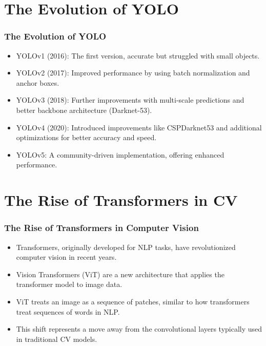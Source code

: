 \documentclass{beamer}
\begin{document}

\section{The Evolution of YOLO}
\begin{frame}
\frametitle{\textbf{The Evolution of YOLO}}
\begin{itemize}
    \item YOLOv1 (2016): The first version, accurate but struggled with small objects.
    \item YOLOv2 (2017): Improved performance by using batch normalization and anchor boxes.
    \item YOLOv3 (2018): Further improvements with multi-scale predictions and better backbone architecture (Darknet-53).
    \item YOLOv4 (2020): Introduced improvements like CSPDarknet53 and additional optimizations for better accuracy and speed.
    \item YOLOv5: A community-driven implementation, offering enhanced performance.
\end{itemize}
\end{frame}


\section{The Rise of Transformers in CV}
\begin{frame}
\frametitle{The Rise of Transformers in Computer Vision}
\begin{itemize}
    \item Transformers, originally developed for NLP tasks, have revolutionized computer vision in recent years.
    \item Vision Transformers (ViT) are a new architecture that applies the transformer model to image data.
    \item ViT treats an image as a sequence of patches, similar to how transformers treat sequences of words in NLP.
    \item This shift represents a move away from the convolutional layers typically used in traditional CV models.
\end{itemize}
\end{frame}
\end{document}
